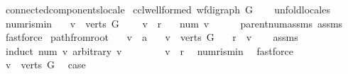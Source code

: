 \begin{isabellebody}
\isamarkupfalse%
\ connected{\isacharunderscore}components{\isacharunderscore}locale\isanewline
{}\isanewline
\isanewline
{}\isamarkupfalse%
\ ccl{\isacharunderscore}wellformed{\isacharcolon}\ {\isachardoublequoteopen}wf{\isacharunderscore}digraph\ G{\isachardoublequoteclose}\isanewline
%
\isadelimproof
\ \ %
\endisadelimproof
%
\isatagproof
{}\isamarkupfalse%
\ unfold{\isacharunderscore}locales%
\endisatagproof
{\isafoldproof}%
%
\isadelimproof
\isanewline
%
\endisadelimproof
\isanewline
{}\isamarkupfalse%
\ num{\isacharunderscore}r{\isacharunderscore}is{\isacharunderscore}min{\isacharcolon}\isanewline
\ \ \ {\isachardoublequoteopen}v\ {\isasymin}\ verts\ G{\isachardoublequoteclose}\ \isanewline
\ \ \ {\isachardoublequoteopen}v\ {\isasymnoteq}\ r{\isachardoublequoteclose}\isanewline
\ \ \ {\isachardoublequoteopen}num\ v\ {\isachargreater}\ {}{\isachardoublequoteclose}\isanewline
%
\isadelimproof
\ \ %
\endisadelimproof
%
\isatagproof
{}\isamarkupfalse%
\ parent{\isacharunderscore}num{\isacharunderscore}assms\ assms\isanewline
\ \ \isamarkupfalse%
\ fastforce%
\endisatagproof
{\isafoldproof}%
%
\isadelimproof
\isanewline
%
\endisadelimproof
\isanewline
{}\isamarkupfalse%
\ path{\isacharunderscore}from{\isacharunderscore}root{\isacharcolon}\isanewline
\ \ \ v\ {\isacharcolon}{\isacharcolon}\ {\isacharprime}a\isanewline
\ \ \ {\isachardoublequoteopen}v\ {\isasymin}\ verts\ G{\isachardoublequoteclose}\isanewline
\ \ \ {\isachardoublequoteopen}r\ {\isasymrightarrow}\isactrlsup {\isacharasterisk}\ v{\isachardoublequoteclose}\isanewline
%
\isadelimproof
\ \ %
\endisadelimproof
%
\isatagproof
{}\isamarkupfalse%
\ assms\isanewline
{}\isamarkupfalse%
\ {\isacharparenleft}induct\ {\isachardoublequoteopen}num\ v{\isachardoublequoteclose}\ arbitrary{\isacharcolon}\ v{\isacharparenright}\isanewline
\ \ \isamarkupfalse%
\ {}\isanewline
\ \ \isamarkupfalse%
\ {\isachardoublequoteopen}v\ {\isacharequal}\ r{\isachardoublequoteclose}\ \isamarkupfalse%
\ num{\isacharunderscore}r{\isacharunderscore}is{\isacharunderscore}min\ \isamarkupfalse%
\ fastforce\isanewline
\ \ \isamarkupfalse%
\ {\isacharbackquoteopen}v\ {\isasymin}\ verts\ G{\isacharbackquoteclose}\ \isamarkupfalse%
\ {\isacharquery}case\ \isamarkupfalse%

\end{isabellebody}
